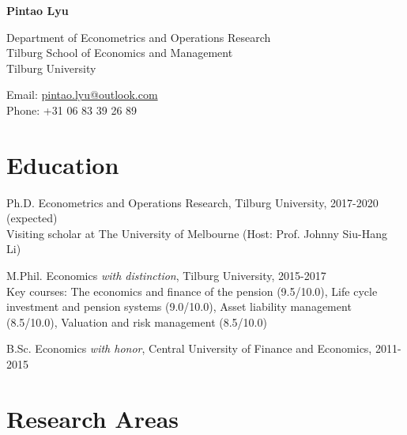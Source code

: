 \documentclass[12pt,letterpaper]{report}
\newcommand{\myname}{Pintao Lyu}
\newcommand{\namefont}[1]{{\normalfont\bfseries\Huge{#1}}}
\begin{document}
    \raggedright

    \namefont{\myname}

    \vspace{1em}
    \begin{minipage}[t]{0.68\textwidth}
        Department of Econometrics and Operations Research \\
        Tilburg School of Economics and Management \\
        Tilburg University
    \end{minipage}
    \begin{minipage}[t]{0.31\textwidth}
        Email: \href{mailto:pintao.lyu@outlook.com}{pintao.lyu@outlook.com} \\
        Phone: +31 06 83 39 26 89 \\
    \end{minipage}
    \vspace{0.5em}



    \section*{Education}

    \begin{tablist}

        \item[Ph.D.] \tab Econometrics and Operations Research, Tilburg University, 2017-2020 (expected) \\
        Visiting scholar at The University of Melbourne (Host: Prof. Johnny Siu-Hang Li)
        \item[M.Phil.]  \tab Economics \textit{with distinction}, Tilburg University, 2015-2017 \\
        Key courses: The economics and finance of the pension (9.5/10.0), Life cycle investment and pension systems (9.0/10.0), Asset liability management (8.5/10.0), Valuation and risk management (8.5/10.0)

        \item[B.Sc.]  \tab Economics \textit{with honor}, Central University of Finance and Economics, 2011-2015

    \end{tablist}






    \section*{Research Areas}
\end{document}
